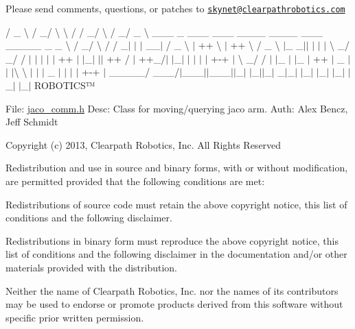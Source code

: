 Please send comments, questions, or patches to \href{mailto:skynet@clearpathrobotics.com}{\tt skynet@clearpathrobotics.\+com}



 / \+\_\+ \textbackslash{} / \+\_\+/ \textbackslash{} \textbackslash{} / / \+\_\+/ \textbackslash{} / \+\_\+/ \+\_\+ \textbackslash{} \+\_\+\+\_\+\+\_\+ \+\_\+ \+\_\+\+\_\+\+\_\+ \+\_\+\+\_\+\+\_\+ \+\_\+\+\_\+\+\_\+\+\_\+ \+\_\+\+\_\+\+\_\+\+\_\+ \+\_\+\+\_\+\+\_\+ \+\_\+\+\_\+\+\_\+\+\_\+\+\_\+ \+\_\+ \+\_\+ \textbackslash{} / \+\_\+/ \textbackslash{} / / \+\_\+$|$ $\vert$ $\vert$ \+\_\+\+\_\+$\vert$ / \+\_\+ \textbackslash{} $\vert$ ++ \textbackslash{} $\vert$ ++ \textbackslash{} / \+\_\+ \textbackslash{} $\vert$\+\_\+ \+\_\+$\vert$$\vert$ $\vert$ $\vert$ $\vert$ \textbackslash{} \+\_\+/ \+\_\+/ / $\vert$ $\vert$ $\vert$ $\vert$ $\vert$ ++ $\vert$ $\vert$\+\_\+$\vert$ $\vert$$\vert$ ++ / $\vert$ ++\+\_\+/$\vert$ $\vert$\+\_\+$\vert$ $\vert$ $\vert$ $\vert$ $\vert$ +-\/+ $\vert$ \textbackslash{} \+\_\+/ / $\vert$ $\vert$\+\_\+ $\vert$ $\vert$\+\_\+ $\vert$ ++ $\vert$ \+\_\+ $\vert$$\vert$ $\vert$\textbackslash{} \textbackslash{} $\vert$ $\vert$ $\vert$ \+\_\+ $\vert$ $\vert$ $\vert$ $\vert$ +-\/+ $\vert$ \+\_\+\+\_\+\+\_\+\+\_\+\+\_\+/ \+\_\+\+\_\+\+\_\+/$\vert$\+\_\+\+\_\+\+\_\+$\vert$$\vert$\+\_\+\+\_\+\+\_\+$\vert$$\vert$\+\_\+$\vert$ $\vert$\+\_\+$\vert$$\vert$\+\_\+$\vert$ \+\_\+$|$\+\_\+$\vert$ $\vert$\+\_\+$\vert$ $\vert$\+\_\+$\vert$ $\vert$\+\_\+$\vert$ $\vert$\+\_\+$\vert$ $\vert$\+\_\+$\vert$ R\+O\+B\+O\+T\+I\+C\+S™

File\+: \hyperlink{jaco__comm_8h}{jaco\+\_\+comm.\+h} Desc\+: Class for moving/querying jaco arm. Auth\+: Alex Bencz, Jeff Schmidt

Copyright (c) 2013, Clearpath Robotics, Inc. All Rights Reserved

Redistribution and use in source and binary forms, with or without modification, are permitted provided that the following conditions are met\+:
\begin{DoxyItemize}
\item Redistributions of source code must retain the above copyright notice, this list of conditions and the following disclaimer.
\item Redistributions in binary form must reproduce the above copyright notice, this list of conditions and the following disclaimer in the documentation and/or other materials provided with the distribution.
\item Neither the name of Clearpath Robotics, Inc. nor the names of its contributors may be used to endorse or promote products derived from this software without specific prior written permission.
\end{DoxyItemize}

